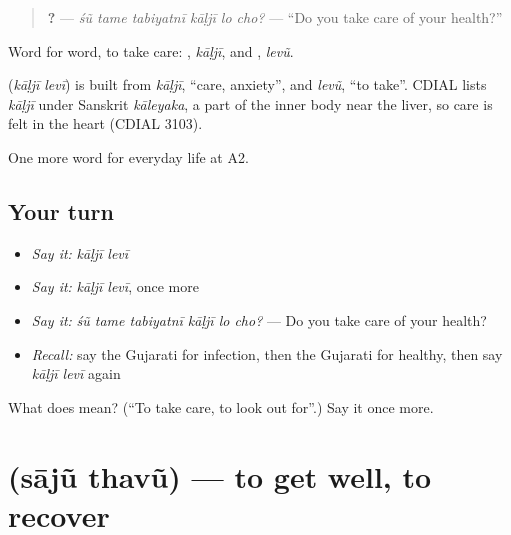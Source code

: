 \begin{quote}
\textbf{     ?} — \emph{śũ tame tabiyatnī kāḷjī lo cho?} — \textquotedblleft{}Do you take care of your health?\textquotedblright{}
\end{quote}

Word for word, to take care: \textbf{}, \emph{kāḷjī}, and \textbf{}, \emph{levũ}.

\begin{cousinweb}
\textbf{ } (\emph{kāḷjī levī}) is built from \emph{kāḷjī}, \textquotedblleft{}care, anxiety\textquotedblright{}, and \emph{levũ}, \textquotedblleft{}to take\textquotedblright{}. CDIAL lists \emph{kāḷjī} under Sanskrit \emph{kāleyaka}, a part of the inner body near the liver, so care is felt in the heart (CDIAL 3103).
\end{cousinweb}

\begin{grammarlens}[title={What you've built}]
One more word for everyday life at A2.
\end{grammarlens}

\subsection*{Your turn}
\begin{itemize}
\raggedright
  \item \emph{Say it:} \emph{kāḷjī levī}
  \item \emph{Say it:} \emph{kāḷjī levī}, once more
  \item \emph{Say it:} \emph{śũ tame tabiyatnī kāḷjī lo cho?} — Do you take care of your health?
  \item \emph{Recall:} say the Gujarati for infection, then the Gujarati for healthy, then say \emph{kāḷjī levī} again
\end{itemize}

\begin{tcolorbox}[breakable,colback=teal!4,colframe=teal!35!black,title={Before you move on}]
What does   mean? (\textquotedblleft{}To take care, to look out for\textquotedblright{}.) Say it once more.
\end{tcolorbox}
\section[\texorpdfstring{\gu{સાજું} \gu{થવું} (sājũ thavũ)}{સાજું થવું (sājũ thavũ)}]{  (sājũ thavũ) — to get well, to recover}

